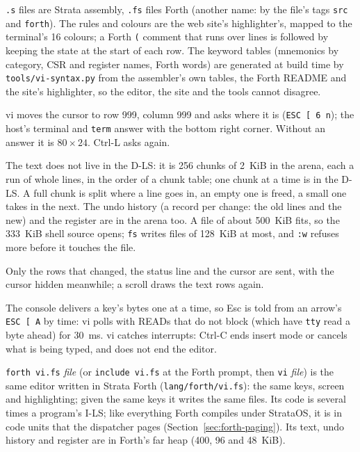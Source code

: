 \begin{description}[leftmargin=1em,style=nextline]
\item[Highlighting] \texttt{.s} files are Strata assembly, \texttt{.fs} files Forth (another name: by
  the file's tags \texttt{src} and \texttt{forth}). The rules and colours are the web site's
  highlighter's, mapped to the terminal's 16 colours; a Forth \texttt{(} comment that runs over lines
  is followed by keeping the state at the start of each row. The keyword tables (mnemonics by
  category, CSR and register names, Forth words) are generated at build time by
  \texttt{tools/vi-syntax.py} from the assembler's own tables, the Forth README and the site's
  highlighter, so the editor, the site and the tools cannot disagree.
\item[The screen's size] vi moves the cursor to row 999, column 999 and asks where it is
  (\texttt{ESC [ 6 n}); the host's terminal and \texttt{term} answer with the bottom right corner.
  Without an answer it is $80\times24$. Ctrl-L asks again.
\item[The text in far memory] The text does not live in the D-LS: it is 256 chunks of 2~KiB in the
  arena, each a run of whole lines, in the order of a chunk table; one chunk at a time is in the D-LS.
  A full chunk is split where a line goes in, an empty one is freed, a small one takes in the next.
  The undo history (a record per change: the old lines and the new) and the register are in the arena
  too. A file of about 500~KiB fits, so the 333~KiB shell source opens; \texttt{fs} writes files of
  128~KiB at most, and \texttt{:w} refuses more before it touches the file.
\item[Drawing] Only the rows that changed, the status line and the cursor are sent, with the cursor
  hidden meanwhile; a scroll draws the text rows again.
\item[Keys and Ctrl-C] The console delivers a key's bytes one at a time, so Esc is told from an
  arrow's \texttt{ESC [ A} by time: vi polls with READs that do not block (which have \texttt{tty}
  read a byte ahead) for 30~ms. vi catches interrupts: Ctrl-C ends insert mode or cancels what is
  being typed, and does not end the editor.
\item[In Forth] \texttt{forth vi.fs} \textit{file} (or \texttt{include vi.fs} at the Forth prompt,
  then \texttt{vi} \textit{file}) is the same editor written in Strata Forth
  (\texttt{lang/forth/vi.fs}): the same keys, screen and highlighting; given the same keys it writes
  the same files. Its code is several times a program's I-LS; like everything Forth compiles under
  StrataOS, it is in code units that the dispatcher pages (Section~\ref{sec:forth-paging}). Its text,
  undo history and register are in Forth's far heap (400, 96 and 48~KiB).
\end{description}


